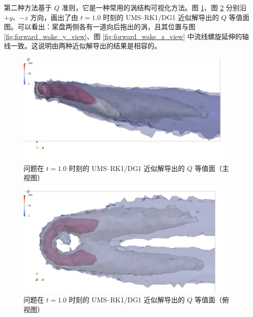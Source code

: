 第二种方法基于 $Q$ 准则，它是一种常用的涡结构可视化方法。图 \ref{fig:forward_Q_y_view}、图
\ref{fig:forward_Q_z_view} 分别沿 $+y$、$-z$ 方向，画出了由 $t=1.0$ 时刻的 UMS–RK1/DG1
近似解导出的 $Q$ 等值面图。可以看出：桨盘两侧各有一道向后拖出的涡，且其位置与图 \ref{fig:forward_wake_y_view}、图
\ref{fig:forward_wake_z_view} 中流线螺旋延伸的轴线一致。这说明由两种近似解导出的结果是相容的。

\begin{figure}[h!]
\begin{centering}
\includegraphics[width=1\textwidth,height=0.28\textheight,keepaspectratio]{figures/forward/p=1/Q_y+}
\par\end{centering}
\caption{\label{fig:forward_Q_y_view}问题在
$t=1.0$ 时刻的 UMS–RK1/DG1 近似解导出的 $Q$ 等值面（主视图）}
\end{figure}

\begin{figure}[h!]
\begin{centering}
\includegraphics[width=1\textwidth,height=0.28\textheight,keepaspectratio]{figures/forward/p=1/Q_z-}
\par\end{centering}
\caption{\label{fig:forward_Q_z_view}问题在
$t=1.0$ 时刻的 UMS–RK1/DG1 近似解导出的 $Q$ 等值面（俯视图）}
\end{figure}


